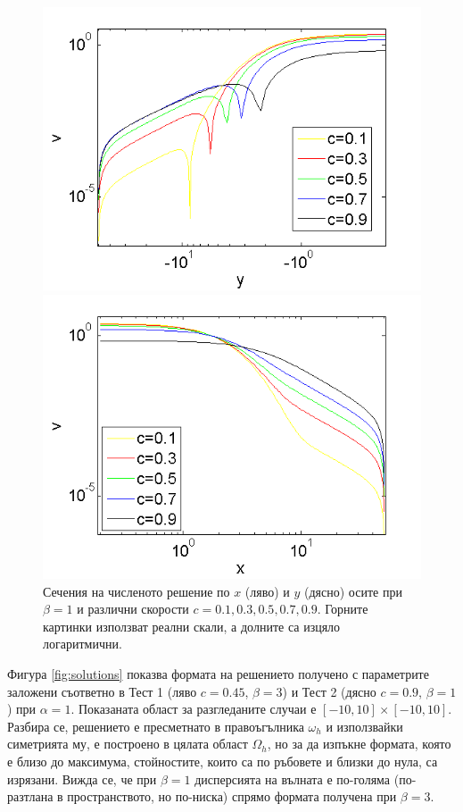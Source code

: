 \documentclass[a4paper]{article}
\theoremstyle{remark}
\begin{document}
\begin{large}
\begin{figure}[ht]
\begin{minipage}[b]{0.5\linewidth}
		\includegraphics[width=\linewidth]{SolutionProfiles/ChristovIVLogX=0_ZB2_bt1_c010_090_h020_O(h^6).png}
	\end{minipage}	
	\begin{minipage}[b]{0.5\linewidth}
		\raggedright
		 \includegraphics[width=\linewidth]{SolutionProfiles/ChristovIVLogY=0_ZB2_bt1_c010_090_h020_O(h^6).png}
	\end{minipage}
	\caption{Сечения на численото решение по $x$ (ляво) и $y$ (дясно) осите при $\beta=1$ и различни скорости $c=0.1,0.3,0.5,0.7,0.9$. Горните картинки използват реални скали, а долните са изцяло логаритмични.}
	\label{profilesSpeedVarying}
\end{figure}
Фигура \ref{fig:solutions} показва формата на решението получено с параметрите заложени съответно в Тест 1 (ляво $c=0.45$,  $\beta=3$) и Тест 2 (дясно $c=0.9$,  $\beta=1$) при $\alpha = 1$. Показаната област за разгледаните случаи е $[-10,10] \times [-10,10]$. Разбира се, решението е пресметнато в правоъгълника $\omega_h$ и използвайки симетрията му, е построено в цялата област $\Omega_h$, но за да изпъкне формата, която е близо до максимума, стойностите, които са по ръбовете и близки до нула, са изрязани. Вижда се, че при $\beta=1$ дисперсията на вълната е по-голяма (по-разтлана в пространството, но по-ниска) спрямо формата получена при $\beta=3$.


\end{large}
\end{document}
